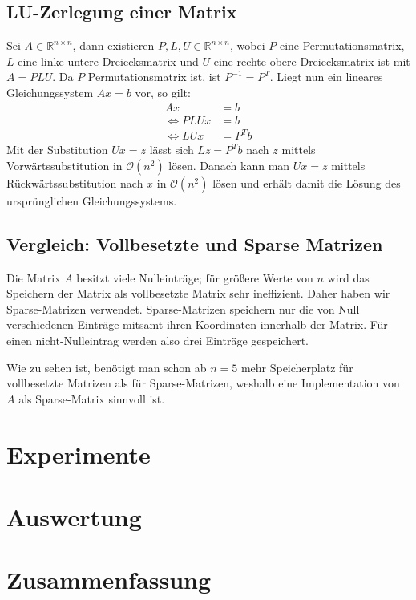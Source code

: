\documentclass{scrartcl}
\theoremstyle{remark}
\begin{document}
\subsection{LU-Zerlegung einer Matrix}
Sei \(A \in \mathbb{R}^{n \times n}\), dann existieren \(P, L, U \in \mathbb{R}^{n \times n}\), 
wobei \(P\) eine Permutationsmatrix, \(L\) eine linke untere Dreiecksmatrix und \(U\) eine rechte obere
Dreiecksmatrix ist mit \(A = PLU\).  \cite{LU}
Da \(P\) Permutationsmatrix ist, ist \(P^{-1} = P^{T}\).
Liegt nun ein lineares Gleichungssystem \(Ax = b\) vor, so gilt:
\begin{align*}
  Ax &= b \\
  \iff PLUx &= b \\
  \iff LUx  &= P^{T}b
\end{align*}
Mit der Substitution \(Ux = z\) lässt sich \(Lz = P^{T}b\) nach \(z\) mittels Vorwärtssubstitution in \(\mathcal{O}(n^{2})\) lösen.
Danach kann man \(Ux = z\) mittels Rückwärtssubstitution nach \(x\) in \(\mathcal{O}(n^{2})\) lösen und erhält damit die Lösung des
ursprünglichen Gleichungssystems.

\subsection{Vergleich: Vollbesetzte und Sparse Matrizen}
Die Matrix \(A\) besitzt viele Nulleinträge; für größere Werte von \(n\) wird das Speichern
der Matrix als vollbesetzte Matrix sehr ineffizient. Daher haben wir Sparse-Matrizen verwendet.
Sparse-Matrizen speichern nur die von Null verschiedenen Einträge mitsamt ihren Koordinaten innerhalb 
der Matrix. Für einen nicht-Nulleintrag werden also drei Einträge gespeichert.  


Wie zu sehen ist, benötigt man schon ab \(n = 5\) mehr Speicherplatz für vollbesetzte Matrizen als für Sparse-Matrizen, 
weshalb eine Implementation von \(A\) als Sparse-Matrix sinnvoll ist.



\section{Experimente}



\section{Auswertung}






\section{Zusammenfassung}



\printbibliography
\end{document}
